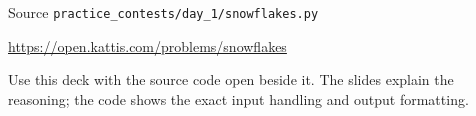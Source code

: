 \documentclass[aspectratio=169,11pt]{beamer}
\begin{document}
\begin{frame}{Source}
\small
{} \texttt{practice\_contests/day\_1/snowflakes.py}

\vspace{0.3cm}
 \url{https://open.kattis.com/problems/snowflakes}

\vspace{0.45cm}
Use this deck with the source code open beside it. The slides explain the reasoning; the code shows the exact input handling and output formatting.
\end{frame}
\end{document}
